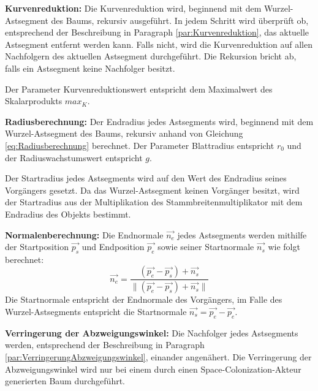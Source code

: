 \begin{description}
	\item \textbf{Kurvenreduktion:} Die Kurvenreduktion wird, beginnend mit dem Wurzel-Astsegment des Baums, rekursiv ausgeführt. In jedem Schritt wird überprüft ob, entsprechend der Beschreibung in Paragraph \ref{par:Kurvenreduktion}, das aktuelle Astsegment entfernt werden kann. Falls nicht, wird die Kurvenreduktion auf allen Nachfolgern des aktuellen Astsegment durchgeführt. Die Rekursion bricht ab, falls ein Astsegment keine Nachfolger besitzt.
	
	Der Parameter \glqq Kurvenreduktionswert\grqq{} entspricht dem Maximalwert des Skalarprodukts $max_K$.\\
	
	\item \textbf{Radiusberechnung:} Der Endradius jedes Astsegments wird, beginnend mit dem Wurzel-Astsegment des Baums, rekursiv anhand von Gleichung \ref{eq:Radiusberechnung} berechnet. Der Parameter \glqq Blattradius\grqq{} entspricht $r_0$ und der \glqq Radiuswachstumswert\grqq{} entspricht $g$. 
	
	Der Startradius jedes Astsegments wird auf den Wert des Endradius seines Vorgängers gesetzt. Da das Wurzel-Astsegment keinen Vorgänger besitzt, wird der Startradius aus der Multiplikation des Stammbreitenmultiplikator mit dem Endradius des Objekts bestimmt.\\
	
	\item \textbf{Normalenberechnung:} Die Endnormale $\overrightarrow{n_{e}}$ jedes Astsegments werden mithilfe der Startposition $\overrightarrow{p_{s}}$ und Endposition $\overrightarrow{p_{e}}$ sowie seiner Startnormale $\overrightarrow{n_{s}}$ wie folgt berechnet:
	\begin{equation}
		\overrightarrow{n_{e}} = \dfrac{(\overrightarrow{p_{e}} - \overrightarrow{p_{s}}) + \overrightarrow{n_{s}}}{\lVert (\overrightarrow{p_{e}} - \overrightarrow{p_{s}}) + \overrightarrow{n_{s}} \rVert}
	\end{equation}
	Die Startnormale entspricht der Endnormale des Vorgängers, im Falle des Wurzel-Astsegments entspricht die Startnormale $\overrightarrow{n_s} = \overrightarrow{p_{e}} - \overrightarrow{p_{e}}$. \\
	
	
	\item \textbf{Verringerung der Abzweigungswinkel:} Die Nachfolger jedes Astsegments werden, entsprechend der Beschreibung in Paragraph \ref{par:VerringerungAbzweigungswinkel}, einander angenähert. Die Verringerung der Abzweigungswinkel wird nur bei einem durch einen Space-Colonization-Akteur generierten Baum durchgeführt.
\end{description}


